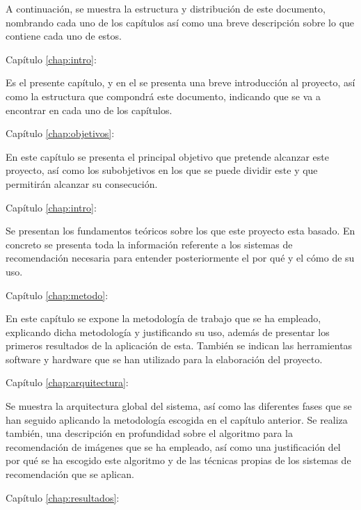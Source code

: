 A continuación, se muestra la estructura y distribución de este documento, nombrando cada uno de los capítulos así como una breve descripción sobre lo que contiene cada uno de estos.
\begin{definitionlist}

\item[Capítulo \ref{chap:intro}:\nameref{chap:intro}]

Es el presente capítulo, y en el se presenta una breve introducción al proyecto, así como la estructura que compondrá este documento, indicando que se va a encontrar en cada uno de los capítulos.


\item[Capítulo \ref{chap:objetivos}:\nameref{chap:objetivos}]

En este capítulo se presenta el principal objetivo que pretende alcanzar este proyecto, así como los subobjetivos en los que se puede dividir este y que permitirán alcanzar su consecución.

\item[Capítulo \ref{chap:intro}:\nameref{chap:antecedentes}]

Se presentan los fundamentos teóricos sobre los que este proyecto esta basado. En concreto se presenta toda la información referente a los sistemas de recomendación necesaria para entender posteriormente el por qué y el cómo de su uso.

\item[Capítulo \ref{chap:metodo}:\nameref{chap:metodo}]

En este capítulo se expone la metodología de trabajo que se ha empleado, explicando dicha metodología y justificando su uso, además de presentar los primeros resultados de la aplicación de esta. También se indican las herramientas software y hardware que se han utilizado para la elaboración del proyecto.

\item[Capítulo \ref{chap:arquitectura}:\nameref{chap:arquitectura}]

Se muestra la arquitectura global del sistema, así como las diferentes fases que se han seguido aplicando la metodología escogida en el capítulo anterior. Se realiza también, una descripción en profundidad sobre el algoritmo para la recomendación de imágenes que se ha empleado, así como una justificación del por qué se ha escogido este algoritmo y de las técnicas propias de los sistemas de recomendación que se aplican.

\item[Capítulo \ref{chap:resultados}:\nameref{chap:resultados}]


\end{definitionlist}
